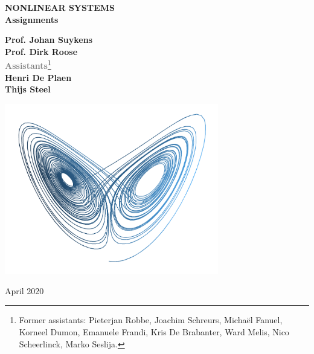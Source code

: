 \vfill
\begin{flushleft}
\vspace*{3cm}
{\textbf{\Huge\color{black}NONLINEAR SYSTEMS}} \\[0.7cm]
{\textbf{\LARGE\color{gray}Assignments}}
\end{flushleft}

\begin{flushright}
\vspace*{1cm}
\textbf{Prof. Johan Suykens \\ Prof. Dirk Roose}\\
\vspace*{1cm}
{\bf\textcolor{gray}{Assistants}}\footnote{Former assistants: Pieterjan Robbe, Joachim Schreurs, Micha\"el Fanuel, Korneel Dumon, Emanuele Frandi, Kris De Brabanter, Ward Melis, Nico Scheerlinck, Marko Seslija.} \\
\textbf{Henri De Plaen \\ Thijs Steel}
\end{flushright}
\vspace*{1cm}

\begin{center}
%
\includegraphics[width=0.7\textwidth]{attractor.png}
\end{center}


\vspace*{0.5cm}
\begin{center}
    April 2020
\end{center}